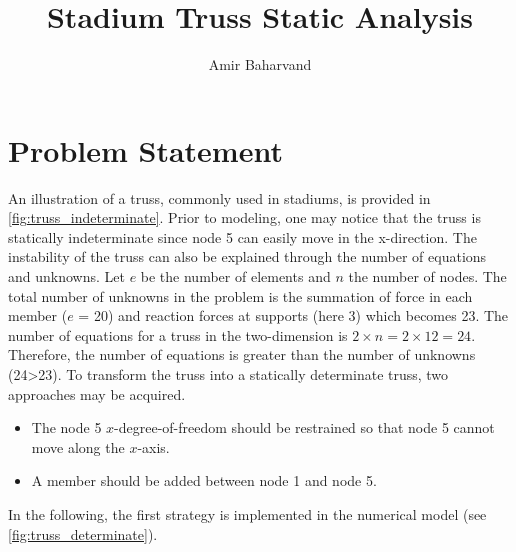 \documentclass{article}
\title{Stadium Truss Static Analysis}
\author{Amir Baharvand }
\date{}
\begin{document}
\maketitle

\section{Problem Statement}
An illustration of a truss, commonly used in stadiums, is provided in \cref{fig:truss_indeterminate}. Prior to modeling, one may notice that the truss is statically indeterminate since node 5 can easily move in the x-direction. The instability of the truss can also be explained through the number of equations and unknowns. Let $e$ be the number of elements and $n$ the number of nodes. The total number of unknowns in the problem is the summation of force in each member ($e$ = 20) and reaction forces at supports (here 3) which becomes 23. The number of equations for a truss in the two-dimension is $2\times n = 2\times 12 = 24$. Therefore, the number of equations is greater than the number of unknowns (24>23). To transform the truss into a statically determinate truss, two approaches may be acquired.

\begin{itemize}
    \item The node 5 $x$-degree-of-freedom should be restrained so that node 5 cannot move along the $x$-axis.
    \item A member should be added between node 1 and node 5.
\end{itemize}

In the following, the first strategy is implemented in the numerical model (see \cref{fig:truss_determinate}). 
\end{document}
